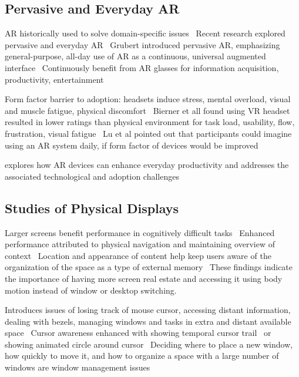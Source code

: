 \subsection{Pervasive and Everyday AR}
AR historically used to solve domain-specific issues~\cite{pavanatto2024xrwild, collins2014surgery, feiner1997touring, henderson2009maintenance, schall2008redlining, thomas1998navigation}
Recent research explored pervasive and everyday AR~\cite{pavanatto2024xrwild, bellgardt2017vrwork, grubert2017pervasive,lu2020glanceable} 
Grubert introduced pervasive AR, emphasizing general-purpose, all-day use of AR as a continuous, universal augmented interface~\cite{pavanatto2024xrwild, gruber2018officefuture} 
Continuously benefit from AR glasses for information acquisition, productivity, entertainment~\cite{pavanatto2024xrwild}

Form factor barrier to adoption: headsets induce stress, mental overload, visual and muscle fatigue, physical discomfort~\cite{pavanatto2024xrwild, guo2020exploring, souchet2023vrergonomics} 
Bierner et all found using VR headset resulted in lower ratings than physical environment for task load, usability, flow, frustration, visual fatigue~\cite{pavanatto2024xrwild, biener2022vrweek} 
Lu et al pointed out that participants could imagine using an AR system daily, if form factor of devices would be improved \cite{pavanatto2024xrwild, lu2021evaluatingglanceable} 

\cite{pavanatto2024xrwild} explores how AR devices can enhance everyday productivity and addresses the associated technological and adoption challenges 


\subsection{Studies of Physical Displays}
Larger screens benefit performance in cognitively difficult tasks~\cite{cetin2018visualanalyticslarge,czerwinski2003largedisplays} 
Enhanced performance attributed to physical navigation and maintaining overview of context~\cite{ball2005tiledhighresolutiondisplay} 
Location and appearance of content help keep users aware of the organization of the space as a type of external memory~\cite{andrews2010space,ball2007movetoimprove} 
These findings indicate
the importance of having more screen real estate and accessing it using
body motion instead of window or desktop switching.

Introduces issues of losing track of mouse cursor, accessing distant information, dealing with bezels, managing windows and tasks in extra and distant available space~\cite{endert2012lhrd,robertson2005largedisplay} 
Cursor awareness enhanced with showing temporal cursor trail~\cite{czerwinski2003largedisplays} 
or showing animated circle around cursor~\cite{robertson2005largedisplay} 
Deciding where to place a new window, how quickly to move it, and how to organize a space with a large number of windows are window management issues~\cite{robertson2005largedisplay} 

